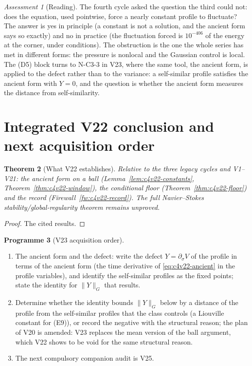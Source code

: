 \documentclass[11pt]{article}
\theoremstyle{plain}
\newtheorem{theorem}{Theorem}[section]
\theoremstyle{definition}
\newtheorem{programme}[theorem]{Programme}
\theoremstyle{remark}
\newtheorem{assessment}[theorem]{Assessment}
\begin{document}
\begin{assessment}[Reading]
\label{ass:c4v22-reading}
The fourth cycle asked the question the third could not: does the
equation, used pointwise, force a nearly constant profile to
fluctuate?  The answer is yes in principle (a constant is not a
solution, and the ancient form says so exactly) and no in practice
(the fluctuation forced is \(10^{-406}\) of the energy at the corner, under
conditions).  The obstruction is the one the whole series has met in
different forms: the pressure is nonlocal and the Gaussian control
is local.  The (D5) block turns to N-C3-3 in V23, where the same
tool, the ancient form, is applied to the defect rather than to the
variance: a self-similar profile satisfies the ancient form with
\(Y=0\), and the question is whether the ancient form measures the
distance from self-similarity.
\end{assessment}

\section{Integrated V22 conclusion and next acquisition order}
\label{sec:c4v22-conclusion}

\begin{theorem}[What V22 establishes]
\label{thm:c4v22-conclusion}
Relative to the three legacy cycles and V1--V21: the ancient form on
a ball (Lemma~\ref{lem:c4v22-constants}, Theorem~\ref{thm:c4v22-window}),
the conditional floor (Theorem~\ref{thm:c4v22-floor}) and the record
(Firewall~\ref{fw:c4v22-record}).  The full Navier--Stokes
stability/global-regularity theorem remains unproved.
\end{theorem}

\begin{proof}
The cited results.
\end{proof}

\begin{programme}[V23 acquisition order]
\label{prog:c4v23}
\begin{enumerate}[label=\textup{(AC\arabic*)},leftmargin=4.8em]
\item The ancient form and the defect: write the defect \(Y=\partial_\sigma V\) of
      the profile in terms of the ancient form (the time derivative of
      \eqref{eq:c4v22-ancient} in the profile variables), and identify
      the self-similar profiles as the fixed points; state the
      identity for \(\|Y\|_G\) that results.
\item Determine whether the identity bounds \(\|Y\|_G\) below by a
      distance of the profile from the self-similar profiles that the
      class controls (a Liouville constant for (E9)), or record the
      negative with the structural reason; the plan of V20 is
      amended: V23 replaces the mean version of the ball argument,
      which V22 shows to be void for the same structural reason.
\item The next compulsory companion audit is V25.
\end{enumerate}
\end{programme}
\end{document}
